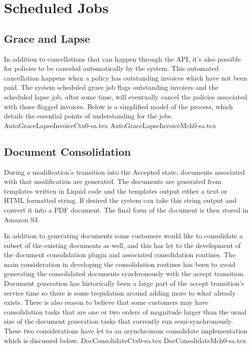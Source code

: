 \chapter{Scheduled Jobs}
\label{intro:jobs} %

\abstract{}

\section{Grace and Lapse}
\label{sec:jobs:1}
In addition to cancellations that can happen through the API, it's also possible for policies to be canceled automatically by
the system. This automated cancellation happens when a policy has outstanding invoices which have not been paid. The system
scheduled grace job flags outstanding invoices and the scheduled lapse job, after some time, will eventually cancel the policies
associated with those flagged invoices. Below is a simplified model of the process, which details the essential points of
understanding for the jobs.
{AutoGraceLapseInvoiceCtx0-sa.tex}
{AutoGraceLapseInvoiceMch0-sa.tex}

\section{Document Consolidation}
\label{sec:jobs:2}
During a modification's transition into the Accepted state, documents associated with that modification are generated.
The documents are generated from templates written in Liquid code and the templates output either a text or HTML formatted
string. If desired the system
can take this string output and convert it into a PDF document. The final form of the document is then stored in Amazon S3.

In addition to generating documents some customers would like to consolidate a subset of the existing documents as well, and this has
let to the development of the document consolidation plugin and associated consolidation routines. The main consideration in
developing the consolidation routines has been to avoid generating the consolidated documents synchronously with the accept transition.
Document generation has historically been a large part of the accept transition's service time so there is some trepidation around adding
more to what already exists. There is also reason to believe that some customers may have consolidation tasks that are one or two orders of
magnitude larger than the usual size of the document generation tasks that currently run semi-synchronously. These two considerations have
let to an asynchronous consolidate implementation which is discussed below.
{DocConsolidateCtx0-sa.tex}
{DocConsolidateMch0-sa.tex}
